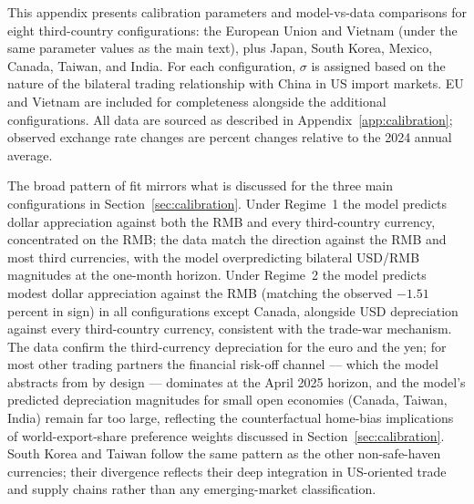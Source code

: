 \documentclass[11pt]{article}
\theoremstyle{plain}
\theoremstyle{remark}
\numberwithin{lemma}{section}
\numberwithin{proposition}{section}
\numberwithin{corollary}{section}
\newcommand{\rev}[1]{{\color{RevBlue}#1}}
\begin{document}
\begin{appendix}
This appendix presents calibration parameters and model-vs-data comparisons for eight third-country configurations: the European Union and Vietnam \rev{(under the same parameter values as the main text)}, plus Japan, South Korea, Mexico, Canada, Taiwan, and India. For each configuration, $\sigma$ is assigned based on the nature of the bilateral trading relationship with China in US import markets. EU and Vietnam are included for completeness alongside the additional configurations. All data are sourced as described in Appendix~\ref{app:calibration}; observed exchange rate changes are percent changes relative to the 2024 annual average.

\rev{The broad pattern of fit mirrors what is discussed for the three main configurations in Section~\ref{sec:calibration}. Under Regime~1 the model predicts dollar appreciation against both the RMB and every third-country currency, concentrated on the RMB; the data match the direction against the RMB and most third currencies, with the model overpredicting bilateral USD/RMB magnitudes at the one-month horizon. Under Regime~2 the model predicts modest dollar appreciation against the RMB (matching the observed $-1.51$ percent in sign) in all configurations except Canada, alongside USD depreciation against every third-country currency, consistent with the trade-war mechanism. The data confirm the third-currency depreciation for the euro and the yen; for most other trading partners the financial risk-off channel --- which the model abstracts from by design --- dominates at the April 2025 horizon, and the model's predicted depreciation magnitudes for small open economies (Canada, Taiwan, India) remain far too large, reflecting the counterfactual home-bias implications of world-export-share preference weights discussed in Section~\ref{sec:calibration}. South Korea and Taiwan follow the same pattern as the other non-safe-haven currencies; their divergence reflects their deep integration in US-oriented trade and supply chains rather than any emerging-market classification.}


\end{appendix}
\end{document}
